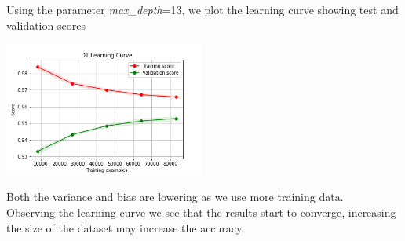 Using the parameter \emph{max\_depth}=13, we plot the learning curve showing test and validation scores

\begin{center}
    \captionsetup{type=figure}
    \includegraphics[width=250px]{learning_curve_DT.png}
\end{center}
Both the variance and bias are lowering as we use more training data. \\
Observing the learning curve we see that the results start to converge, increasing the size of the dataset may increase the accuracy.
